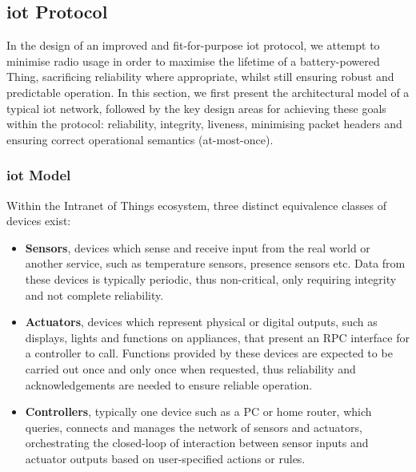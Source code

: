 \documentclass{mpaper}
\begin{document}
\subsection{iot Protocol} %
\label{sub:design_iot_protocol}
In the design of an improved and fit-for-purpose iot protocol, we attempt to minimise radio usage in order to maximise the lifetime of a battery-powered Thing, sacrificing reliability where appropriate, whilst still ensuring robust and predictable operation. In this section, we first present the architectural model of a typical iot network, followed by the key design areas for achieving these goals within the protocol: reliability, integrity, liveness, minimising packet headers and ensuring correct operational semantics (at-most-once). 

\subsubsection*{iot Model} %
\label{ssub:iot_model}
Within the Intranet of Things ecosystem, three distinct equivalence classes of devices exist:
\begin{itemize}
  \item \textbf{Sensors}, devices which sense and receive input from the real world or another service, such as temperature sensors, presence sensors etc. Data from these devices is typically periodic, thus non-critical, only requiring integrity and not complete reliability.
  \item \textbf{Actuators}, devices which represent physical or digital outputs, such as displays, lights and functions on appliances, that present an RPC interface for a controller to call. Functions provided by these devices are expected to be carried out once and only once when requested, thus reliability and acknowledgements are needed to ensure reliable operation. 
  \item \textbf{Controllers}, typically one device such as a PC or home router, which queries, connects and manages the network of sensors and actuators, orchestrating the closed-loop of interaction between sensor inputs and actuator outputs based on user-specified actions or rules.
\end{itemize}
\end{document}
